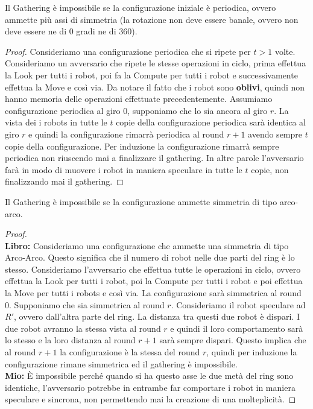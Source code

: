 \begin{theorem}
    Il Gathering è impossibile se la configurazione iniziale è periodica,
    ovvero ammette più assi di simmetria (la rotazione non deve essere banale,
    ovvero non deve essere ne di 0 gradi ne di 360).
\end{theorem}

\begin{proof}
    Consideriamo una configurazione periodica che si ripete per $t>1$ volte.
    Consideriamo un avversario che ripete le stesse operazioni in ciclo, prima
    effettua la Look per tutti i robot, poi fa la Compute per tutti i robot e
    successivamente effettua la Move e così via. Da notare il fatto che i robot
    sono \textbf{oblivi}, quindi non hanno memoria delle operazioni effettuate
    precedentemente. Assumiamo configurazione periodica al giro 0, supponiamo che
    lo sia ancora al giro $r$. La vista dei i robots in tutte le $t$ copie della
    configurazione periodica sarà identica al giro $r$ e quindi la configurazione
    rimarrà periodica al round $r+1$ avendo sempre $t$ copie della configurazione.
    Per induzione la configurazione rimarrà sempre periodica non riuscendo mai a
    finalizzare il gathering. In altre parole l'avversario farà in modo di muovere
    i robot in maniera speculare in tutte le $t$ copie, non finalizzando mai il
    gathering.
\end{proof}

\begin{theorem}
    Il Gathering è impossibile se la configurazione ammette simmetria di tipo
    arco-arco.
\end{theorem}

\begin{proof}
    \ \\
    \textbf{Libro:} Consideriamo una configurazione che ammette una simmetria di tipo
    Arco-Arco. Questo significa che il numero di robot nelle due parti del ring è
    lo stesso. Consideriamo l'avversario che effettua tutte le operazioni in
    ciclo, ovvero effettua la Look per tutti i robot, poi la Compute per tutti i
    robot e poi effettua la Move per tutti i robots e così via. La configurazione
    sarà simmetrica al round 0. Supponiamo che sia simmetrica al round $r$.
    Consideriamo il robot speculare ad $R'$, ovvero dall'altra parte del ring. La
    distanza tra questi due robot è dispari. I due robot avranno la stessa vista
    al round $r$ e quindi il loro comportamento sarà lo stesso e la loro distanza
    al round $r+1$ sarà sempre dispari. Questo implica che al round $r+1$ la
    configurazione è la stessa del round $r$, quindi per induzione la
    configurazione rimane simmetrica ed il gathering è impossibile.\\

    \textbf{Mio:} È impossibile perché quando si ha questo asse le due metà del
    ring sono identiche, l'avversario potrebbe in entrambe far comportare i robot
    in maniera speculare e sincrona, non permettendo mai la creazione di una
    molteplicità. %
\end{proof}

